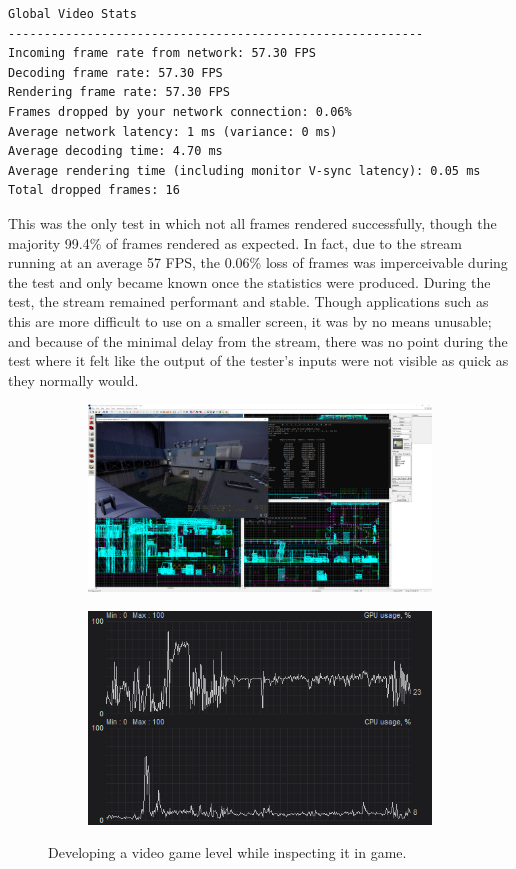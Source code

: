 \begin{lstlisting}[style=plaintext,title=Statistics recorded while streaming Blender (Figure \ref{fig:RealWorldBlender})]
  Global Video Stats
----------------------------------------------------------
Incoming frame rate from network: 57.30 FPS
Decoding frame rate: 57.30 FPS
Rendering frame rate: 57.30 FPS
Frames dropped by your network connection: 0.06%
Average network latency: 1 ms (variance: 0 ms)
Average decoding time: 4.70 ms
Average rendering time (including monitor V-sync latency): 0.05 ms
Total dropped frames: 16
\end{lstlisting}

This was the only test in which not all frames rendered successfully, though the majority 99.4\% of frames rendered as expected.
In fact, due to the stream running at an average 57 FPS, the 0.06\% loss of frames was imperceivable during the test and only became known once the statistics were produced.
During the test, the stream remained performant and stable.
Though applications such as this are more difficult to use on a smaller screen, it was by no means unusable; and because of the minimal delay from the stream, there was no point during the test where it felt like the output of the tester's inputs were not visible as quick as they normally would.

\begin{figure}[t]
  \centering
  \begin{subfigure}{1\textwidth}
    \centering
    \includegraphics[width=.9\linewidth]{Figures/realworld/gamedev}
  \end{subfigure}
  \begin{subfigure}{1\textwidth}
    \centering
    \includegraphics[width=.5\linewidth]{Figures/realworld/gamedevstats}
  \end{subfigure}
  \caption[Streaming the development of a video game level]{Developing a video game level while inspecting it in game.}
  \label{fig:RealWorldGameDev}
\end{figure}

